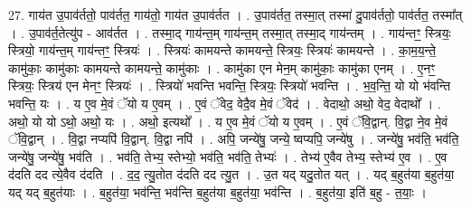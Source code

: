 \documentclass[17pt]{extarticle}
\begin{document}
27. गाय॑त उ॒पाव॑र्ततो॒ पाव॑र्तत॒ गाय॑तो॒ गाय॑त उ॒पाव॑र्तत । . उ॒पाव॑र्तत॒ तस्मा॒त् तस्मा॑ दु॒पाव॑र्ततो॒ पाव॑र्तत॒ तस्मा᳚त् । . उ॒पाव॑र्त॒तेत्यु॑प - आव॑र्तत । . तस्मा॒द् गाय॑न्त॒म् गाय॑न्त॒म् तस्मा॒त् तस्मा॒द् गाय॑न्तम् । . गाय॑न्तꣳ॒॒ स्त्रियः॒ स्त्रियो॒ गाय॑न्त॒म् गाय॑न्तꣳ॒॒ स्त्रियः॑ । . स्त्रियः॑ कामयन्ते कामयन्ते॒ स्त्रियः॒ स्त्रियः॑ कामयन्ते । . का॒म॒य॒न्ते॒ कामु॑काः॒ कामु॑काः कामयन्ते कामयन्ते॒ कामु॑काः । . कामु॑का एन मेन॒म् कामु॑काः॒ कामु॑का एनम् । . ए॒नꣳ॒॒ स्त्रियः॒ स्त्रिय॑ एन मेनꣳ॒॒ स्त्रियः॑ । . स्त्रियो॑ भवन्ति भवन्ति॒ स्त्रियः॒ स्त्रियो॑ भवन्ति । . भ॒व॒न्ति॒ यो यो भ॑वन्ति भवन्ति॒ यः । . य ए॒व मे॒वं ॅयो य ए॒वम् । . ए॒वं ॅवेद॒ वेदै॒व मे॒वं ॅवेद॑ । . वेदाथो॒ अथो॒ वेद॒ वेदाथो᳚ । . अथो॒ यो यो ऽथो॒ अथो॒ यः । . अथो॒ इत्यथो᳚ । . य ए॒व मे॒वं ॅयो य ए॒वम् । . ए॒वं ॅवि॒द्वान्. वि॒द्वा ने॒व मे॒वं ॅवि॒द्वान् । . वि॒द्वा नप्यपि॑ वि॒द्वान्. वि॒द्वा नपि॑ । . अपि॒ जन्ये॑षु॒ जन्ये॒ ष्वप्यपि॒ जन्ये॑षु । . जन्ये॑षु॒ भव॑ति॒ भव॑ति॒ जन्ये॑षु॒ जन्ये॑षु॒ भव॑ति । . भव॑ति॒ तेभ्य॒ स्तेभ्यो॒ भव॑ति॒ भव॑ति॒ तेभ्यः॑ । . तेभ्य॑ ए॒वैव तेभ्य॒ स्तेभ्य॑ ए॒व । . ए॒व द॑दति दद त्ये॒वैव द॑दति । . द॒द॒ त्यु॒तोत द॑दति दद त्यु॒त । . उ॒त यद् यदु॒तोत यत् । . यद् ब॒हुत॑या ब॒हुत॑या॒ यद् यद् ब॒हुत॑याः । . ब॒हुत॑या॒ भव॑न्ति॒ भव॑न्ति ब॒हुत॑या ब॒हुत॑या॒ भव॑न्ति । . ब॒हुत॑या॒ इति॑ ब॒हु - त॒याः॒ । \newline
\end{document}
